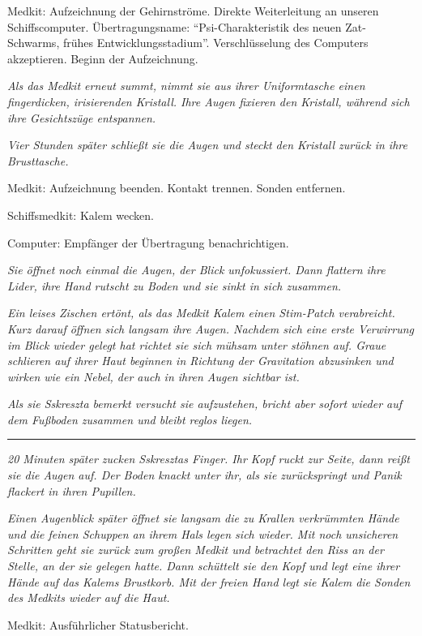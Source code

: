 \documentclass[11pt]{article}
\begin{document}
Medkit: Aufzeichnung der Gehirnströme. Direkte Weiterleitung an unseren
Schiffscomputer. Übertragungsname: ``Psi-Charakteristik des neuen
Zat-Schwarms, frühes Entwicklungsstadium''. Verschlüsselung des
Computers akzeptieren. Beginn der Aufzeichnung.

\emph{Als das Medkit erneut summt, nimmt sie aus ihrer Uniformtasche
einen fingerdicken, irisierenden Kristall. Ihre Augen fixieren den
Kristall, während sich ihre Gesichtszüge entspannen.}

\emph{Vier Stunden später schließt sie die Augen und steckt den Kristall
zurück in ihre Brusttasche.}

Medkit: Aufzeichnung beenden. Kontakt trennen. Sonden entfernen.

Schiffsmedkit: Kalem wecken.

Computer: Empfänger der Übertragung benachrichtigen.

\emph{Sie öffnet noch einmal die Augen, der Blick unfokussiert. Dann
flattern ihre Lider, ihre Hand rutscht zu Boden und sie sinkt in sich
zusammen.}

\emph{Ein leises Zischen ertönt, als das Medkit Kalem einen Stim-Patch
verabreicht. Kurz darauf öffnen sich langsam ihre Augen. Nachdem sich
eine erste Verwirrung im Blick wieder gelegt hat richtet sie sich mühsam
unter stöhnen auf. Graue schlieren auf ihrer Haut beginnen in Richtung
der Gravitation abzusinken und wirken wie ein Nebel, der auch in ihren
Augen sichtbar ist.}

\emph{Als sie Sskreszta bemerkt versucht sie aufzustehen, bricht aber
sofort wieder auf dem Fußboden zusammen und bleibt reglos liegen.}

\begin{center}\rule{3in}{0.4pt}\end{center}

\emph{20 Minuten später zucken Sskresztas Finger. Ihr Kopf ruckt zur
Seite, dann reißt sie die Augen auf. Der Boden knackt unter ihr, als sie
zurückspringt und Panik flackert in ihren Pupillen.}

\emph{Einen Augenblick später öffnet sie langsam die zu Krallen
verkrümmten Hände und die feinen Schuppen an ihrem Hals legen sich
wieder. Mit noch unsicheren Schritten geht sie zurück zum großen Medkit
und betrachtet den Riss an der Stelle, an der sie gelegen hatte. Dann
schüttelt sie den Kopf und legt eine ihrer Hände auf das Kalems
Brustkorb. Mit der freien Hand legt sie Kalem die Sonden des Medkits
wieder auf die Haut.}

Medkit: Ausführlicher Statusbericht.
\end{document}
